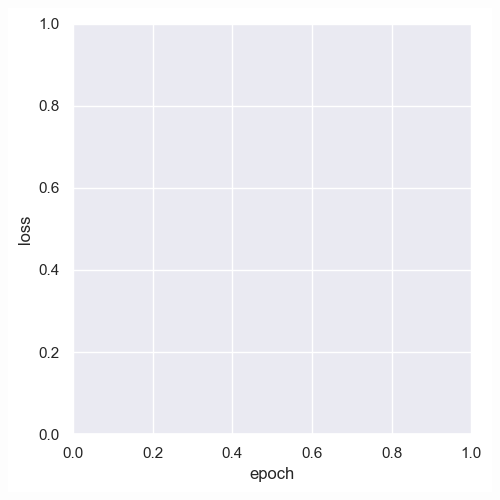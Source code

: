 \documentclass[a4paper, 11pt]{article}
\begin{document}
\begin{center}
\includegraphics[width=.9\linewidth]{./.ob-jupyter/5e1419e04ffa8611806495b89d9dcbfafe0c4049.png}
\end{center}
\end{document}
